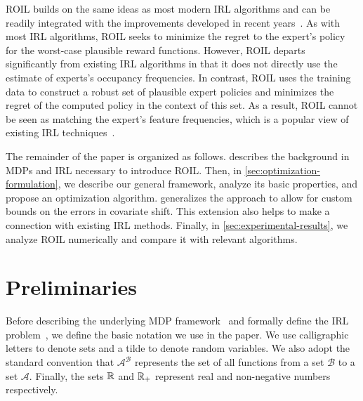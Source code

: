\documentclass[10pt]{article}
\renewcommand{\cite}{\citep}
\newcommand{\gersi}[1]{\textcolor{red}{[#1]}}
\begin{document}
ROIL builds on the same ideas as most modern IRL algorithms and can be readily integrated with the improvements developed in recent years~\cite{Arora2020}. As with most IRL algorithms, ROIL seeks to minimize the regret to the expert's policy for the worst-case plausible reward functions. However, ROIL departs significantly from existing IRL algorithms in that it does not directly use the estimate of experts's occupancy frequencies. In contrast, ROIL uses the training data to construct a robust set of plausible expert policies and minimizes the regret of the computed policy in the context of this set. As a result, ROIL cannot be seen as matching the expert's feature frequencies, which is a popular view of existing IRL techniques~\cite{abbeel2004,Syed2008,Ho2016}.

The remainder of the paper is organized as follows.  describes the background in MDPs and IRL necessary to introduce ROIL. Then, in \cref{sec:optimization-formulation}, we describe our general framework, analyze its basic properties, and propose an optimization algorithm.  generalizes the approach to allow for custom bounds on the errors in covariate shift. This extension also helps to make a connection with existing IRL methods. Finally, in \cref{sec:experimental-results}, we analyze ROIL numerically and compare it with relevant algorithms. 

\section{Preliminaries}\label{sec:preliminaries}

Before describing the underlying MDP framework~\cite{Puterman1994} and formally define the IRL problem~\cite{abbeel2004,Syed2008,Ho2016}, we define the basic notation we use in the paper. We use calligraphic letters to denote sets and a tilde to denote random variables. We also adopt the standard convention that $\mathcal{A}^{\mathcal{B}}$ represents the set of all functions from a set $\mathcal{B}$ to a set $\mathcal{A}$. Finally, the sets $\mathbb{R}$ and $\mathbb{R}_+$ represent real and non-negative numbers respectively. 


\end{document}
